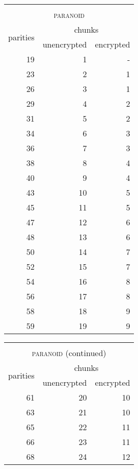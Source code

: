 \documentclass[a4paper,11pt]{article}
\begin{document}
\begin{table}[!ht]
\begin{minipage}{.49\linewidth}
\centering
\begin{tabular}{|r|r|r|}
\multicolumn{3}{c}{\textsc{}}\\
\multicolumn{3}{c}{\textsc{paranoid}}\\\hline
\multirow{2}{1.5cm}{\centering 
 parities } 
&\multicolumn{2}{|c|}{ chunks }\\\cline{2-3}
&\multicolumn{1}{|c|}{unencrypted} 
&\multicolumn{1}{|c|}{encrypted} \\\hline\hline
19 & 1 & -\\
23 & 2  & 1\\
26 & 3  & 1\\
29 & 4  & 2\\
31 & 5  & 2\\
34 & 6  & 3\\
36 & 7  & 3\\
38 & 8  & 4\\
40 & 9  & 4\\
43 & 10 & 5\\
45 & 11 & 5\\
47 & 12 & 6\\
48 & 13 & 6\\
50 & 14 & 7\\
52 & 15 & 7\\
54 & 16 & 8\\
56 & 17 & 8\\
58 & 18 & 9\\
59 & 19 & 9\\
\hline
\end{tabular}
\end{minipage}
\begin{minipage}{.49\linewidth}
\centering
\begin{tabular}{|r|r|r|}
\multicolumn{3}{c}{\textsc{}}\\
\multicolumn{3}{c}{\textsc{paranoid} (continued)}\\\hline
\multirow{2}{1.5cm}{\centering 
 parities } 
&\multicolumn{2}{|c|}{ chunks }\\\cline{2-3}
&\multicolumn{1}{|c|}{unencrypted} 
&\multicolumn{1}{|c|}{encrypted} \\\hline\hline
61 & 20 & 10\\
63 & 21 & 10\\
65 & 22 & 11\\
66 & 23 & 11\\
68 & 24 & 12\\

\end{tabular}
\end{minipage}
\end{table}
\end{document}
